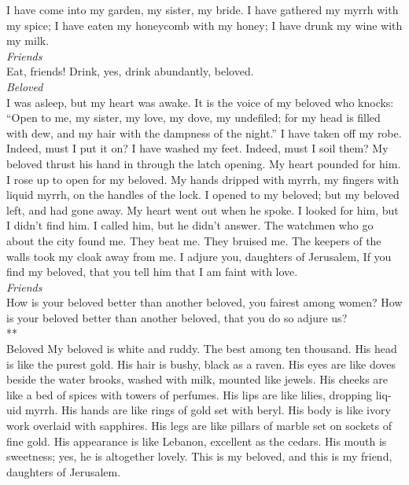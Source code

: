 \begin{paracol}{2}
\begin{otherlanguage}{english}
 I have come into my garden, my sister, my bride. I have
gathered my myrrh with my spice; I have eaten my honeycomb with my
honey; I have drunk my wine with my milk.\\
\emph{Friends }\\
Eat, friends! Drink, yes, drink abundantly, beloved.\\
\emph{Beloved }\\
 I was asleep, but my heart was awake. It is the voice of
my beloved who knocks: ``Open to me, my sister, my love, my dove, my
undefiled; for my head is filled with dew, and my hair with the dampness
of the night.''  I have taken off my robe. Indeed, must I
put it on? I have washed my feet. Indeed, must I soil them?
 My beloved thrust his hand in through the latch opening.
My heart pounded for him.  I rose up to open for my
beloved. My hands dripped with myrrh, my fingers with liquid myrrh, on
the handles of the lock.  I opened to my beloved; but my
beloved left, and had gone away. My heart went out when he spoke. I
looked for him, but I didn't find him. I called him, but he didn't
answer.  The watchmen who go about the city found me. They
beat me. They bruised me. The keepers of the walls took my cloak away
from me.  I adjure you, daughters of Jerusalem, If you
find my beloved, that you tell him that I am faint with love.\\
\emph{Friends }\\
 How is your beloved better than another beloved, you
fairest among women? How is your beloved better than another beloved,
that you do so adjure us?\\
**\\
Beloved  My beloved is white and ruddy. The best among
ten thousand.  His head is like the purest gold. His hair
is bushy, black as a raven.  His eyes are like doves
beside the water brooks, washed with milk, mounted like jewels.
 His cheeks are like a bed of spices with towers of
perfumes. His lips are like lilies, dropping liquid myrrh.
 His hands are like rings of gold set with beryl. His
body is like ivory work overlaid with sapphires.  His
legs are like pillars of marble set on sockets of fine gold. His
appearance is like Lebanon, excellent as the cedars.  His
mouth is sweetness; yes, he is altogether lovely. This is my beloved,
and this is my friend, daughters of Jerusalem.


\end{otherlanguage}
\end{paracol}
